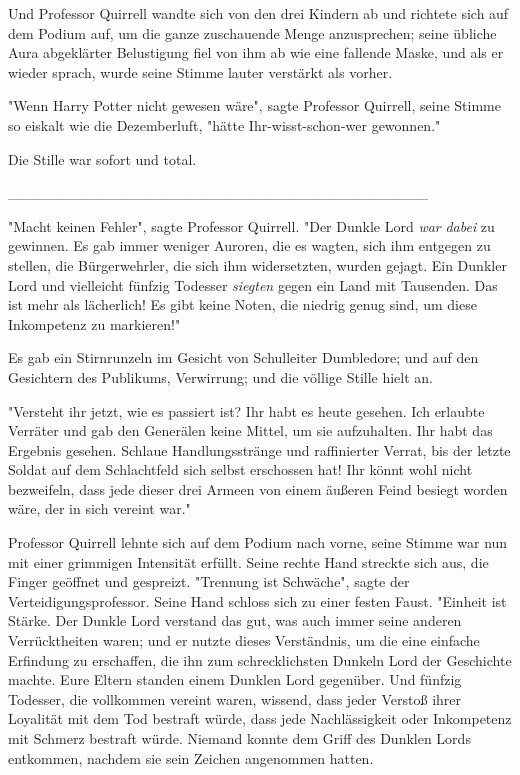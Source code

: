 {Und Professor Quirrell wandte sich von den drei Kindern ab und richtete sich auf dem Podium auf, um die ganze zuschauende Menge anzusprechen; seine übliche Aura abgeklärter Belustigung fiel von ihm ab wie eine fallende Maske, und als er wieder sprach, wurde seine Stimme lauter verstärkt als vorher.

"Wenn Harry Potter nicht gewesen wäre", sagte Professor Quirrell, seine Stimme so eiskalt wie die Dezemberluft, "hätte Ihr-wisst-schon-wer gewonnen."

Die Stille war sofort und total.

\_\_\_\_\_\_\_\_\_\_\_\_\_\_\_\_\_\_\_\_\_\_\_\_\_\_\_\_\_\_\_\_\_\_\_\_\_\_\_\_

"Macht keinen Fehler", sagte Professor Quirrell. "Der Dunkle Lord \emph{war} \emph{dabei} zu gewinnen. Es gab immer weniger Auroren, die es wagten, sich ihm entgegen zu stellen, die Bürgerwehrler, die sich ihm widersetzten, wurden gejagt. Ein Dunkler Lord und vielleicht fünfzig Todesser \emph{siegten} gegen ein Land mit Tausenden. Das ist mehr als lächerlich! Es gibt keine Noten, die niedrig genug sind, um diese Inkompetenz zu markieren!"

Es gab ein Stirnrunzeln im Gesicht von Schulleiter Dumbledore; und auf den Gesichtern des Publikums, Verwirrung; und die völlige Stille hielt an.

"Versteht ihr jetzt, wie es passiert ist? Ihr habt es heute gesehen. Ich erlaubte Verräter und gab den Generälen keine Mittel, um sie aufzuhalten. Ihr habt das Ergebnis gesehen. Schlaue Handlungsstränge und raffinierter Verrat, bis der letzte Soldat auf dem Schlachtfeld sich selbst erschossen hat! Ihr könnt wohl nicht bezweifeln, dass jede dieser drei Armeen von einem äußeren Feind besiegt worden wäre, der in sich vereint war."

Professor Quirrell lehnte sich auf dem Podium nach vorne, seine Stimme war nun mit einer grimmigen Intensität erfüllt. Seine rechte Hand streckte sich aus, die Finger geöffnet und gespreizt. "Trennung ist Schwäche", sagte der Verteidigungsprofessor. Seine Hand schloss sich zu einer festen Faust. "Einheit ist Stärke. Der Dunkle Lord verstand das gut, was auch immer seine anderen Verrücktheiten waren; und er nutzte dieses Verständnis, um die eine einfache Erfindung zu erschaffen, die ihn zum schrecklichsten Dunkeln Lord der Geschichte machte. Eure Eltern standen einem Dunklen Lord gegenüber. Und fünfzig Todesser, die vollkommen vereint waren, wissend, dass jeder Verstoß ihrer Loyalität mit dem Tod bestraft würde, dass jede Nachlässigkeit oder Inkompetenz mit Schmerz bestraft würde. Niemand konnte dem Griff des Dunklen Lords entkommen, nachdem sie sein Zeichen angenommen hatten.

}
